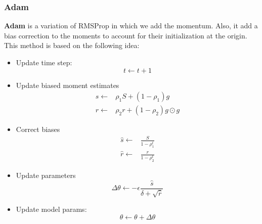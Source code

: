 \subsubsection{Adam}
\textbf{Adam} is a variation of RMSProp in which we add the momentum. Also, it
add a bias correction to the moments to account for their initialization at the
origin. This method is based on the following idea:
\begin{itemize}
    \item Update time step:
          \begin{equation}
              t \gets t + 1
          \end{equation}
    \item Update biased moment estimates
          \begin{equation}
              \begin{split}
                  s \gets & \rho_1 S + (1 - \rho_1)g          \\
                  r \gets & \rho_2 r + (1 - \rho_2) g \odot g
              \end{split}
          \end{equation}
    \item Correct biases
          \begin{equation}
              \begin{split}
                  \hat{s} \gets & \frac{S}{1 - \rho_1^t} \\
                  \hat{r} \gets & \frac{r}{1 - \rho_2^t}
              \end{split}
          \end{equation}
    \item Update parameters
          \begin{equation}
              \Delta \theta \gets - \epsilon \frac{\hat{s}}{\delta + \sqrt{\hat{r}}}
          \end{equation}
    \item Update model params:
          \begin{equation}
              \theta \gets \theta + \Delta \theta
          \end{equation}
\end{itemize}
